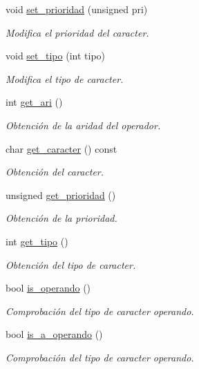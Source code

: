 \begin{DoxyCompactItemize}
void \hyperlink{classcaracter__t_af64d9d63ce21bd3d2c0db44e4caa0974}{set\+\_\+prioridad} (unsigned pri)
\begin{DoxyCompactList}\small\item\em Modifica el prioridad del caracter. \end{DoxyCompactList}\item 
void \hyperlink{classcaracter__t_aed3d04cda835451c7fe7d752ffe1dc55}{set\+\_\+tipo} (int tipo)
\begin{DoxyCompactList}\small\item\em Modifica el tipo de caracter. \end{DoxyCompactList}\item 
int \hyperlink{classcaracter__t_a6226f271e775dc48d36e29f5d2005f5b}{get\+\_\+ari} ()
\begin{DoxyCompactList}\small\item\em Obtención de la aridad del operador. \end{DoxyCompactList}\item 
char \hyperlink{classcaracter__t_ab743675dd1000f161881b568c137fd8d}{get\+\_\+caracter} () const
\begin{DoxyCompactList}\small\item\em Obtención del caracter. \end{DoxyCompactList}\item 
unsigned \hyperlink{classcaracter__t_a1b49616f0115a77c94bfd747e7f128f3}{get\+\_\+prioridad} ()
\begin{DoxyCompactList}\small\item\em Obtención de la prioridad. \end{DoxyCompactList}\item 
int \hyperlink{classcaracter__t_a6988fe91ec8173773a19f85303b00ec1}{get\+\_\+tipo} ()
\begin{DoxyCompactList}\small\item\em Obtención del tipo de caracter. \end{DoxyCompactList}\item 
bool \hyperlink{classcaracter__t_aafa8823c9f96891fcc9acbdadd54f197}{is\+\_\+operando} ()
\begin{DoxyCompactList}\small\item\em Comprobación del tipo de caracter operando. \end{DoxyCompactList}\item 
bool \hyperlink{classcaracter__t_a1afa6c012abdce3daf85f555ea8c8d7c}{is\+\_\+a\+\_\+operando} ()
\begin{DoxyCompactList}\small\item\em Comprobación del tipo de caracter operando. \end{DoxyCompactList}\item 

\end{DoxyCompactItemize}

